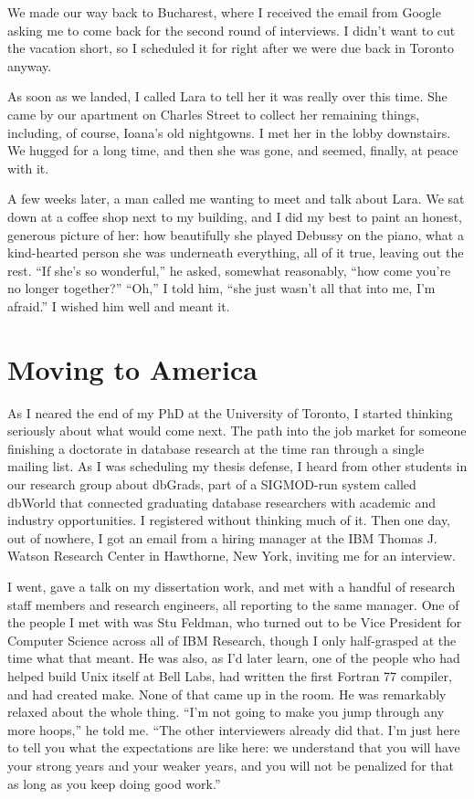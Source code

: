 \documentclass[12pt]{book}
\begin{document}
We made our way back to Bucharest, where I received the email from
Google asking me to come back for the second round of interviews. I
didn't want to cut the vacation short, so I scheduled it for right after
we were due back in Toronto anyway.

As soon as we landed, I called Lara to tell her it was really over this
time. She came by our apartment on Charles Street to collect her
remaining things, including, of course, Ioana's old nightgowns. I met
her in the lobby downstairs. We hugged for a long time, and then she was
gone, and seemed, finally, at peace with it.

A few weeks later, a man called me wanting to meet and talk about Lara.
We sat down at a coffee shop next to my building, and I did my best to
paint an honest, generous picture of her: how beautifully she played
Debussy on the piano, what a kind-hearted person she was underneath
everything, all of it true, leaving out the rest. ``If she's so
wonderful,'' he asked, somewhat reasonably, ``how come you're no longer
together?'' ``Oh,'' I told him, ``she just wasn't all that into me, I'm
afraid.'' I wished him well and meant it.


\section{Moving to America}

As I neared the end of my PhD at the University of Toronto, I started
thinking seriously about what would come next. The path into the job
market for someone finishing a doctorate in database research at the
time ran through a single mailing list. As I was scheduling my thesis
defense, I heard from other students in our research group about
dbGrads, part of a SIGMOD-run system called dbWorld that connected
graduating database researchers with academic and industry
opportunities. I registered without thinking much of it. Then one day,
out of nowhere, I got an email from a hiring manager at the IBM Thomas
J. Watson Research Center in Hawthorne, New York, inviting me for an
interview.

I went, gave a talk on my dissertation work, and met with a handful of
research staff members and research engineers, all reporting to the same
manager. One of the people I met with was Stu Feldman, who turned out to
be Vice President for Computer Science across all of IBM Research,
though I only half-grasped at the time what that meant. He was also, as
I'd later learn, one of the people who had helped build Unix itself at
Bell Labs, had written the first Fortran 77 compiler, and had created
make. None of that came up in the room. He was remarkably relaxed about
the whole thing. ``I'm not going to make you jump through any more
hoops,'' he told me. ``The other interviewers already did that. I'm just
here to tell you what the expectations are like here: we understand that
you will have your strong years and your weaker years, and you will not
be penalized for that as long as you keep doing good work.''
\end{document}
